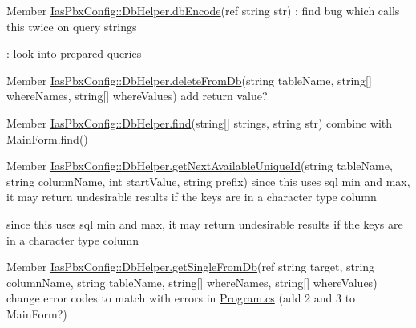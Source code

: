 \label{todo__todo000013}
\hypertarget{todo__todo000013}{}
 
\begin{DoxyDescription}
\item[Member \hyperlink{class_ias_pbx_config_1_1_db_helper_aad194ee869204b99082e7779888addd1}{IasPbxConfig::DbHelper.dbEncode}(ref string str) ]: find bug which calls this twice on query strings 

: look into prepared queries 
\end{DoxyDescription}

\label{todo__todo000021}
\hypertarget{todo__todo000021}{}
 
\begin{DoxyDescription}
\item[Member \hyperlink{class_ias_pbx_config_1_1_db_helper_a0b0e09192378e91c00084b10b52bff0a}{IasPbxConfig::DbHelper.deleteFromDb}(string tableName, string\mbox{[}\mbox{]} whereNames, string\mbox{[}\mbox{]} whereValues) ]add return value? 
\end{DoxyDescription}

\label{todo__todo000014}
\hypertarget{todo__todo000014}{}
 
\begin{DoxyDescription}
\item[Member \hyperlink{class_ias_pbx_config_1_1_db_helper_a92c16852946e46462fe8bb9923ce374c}{IasPbxConfig::DbHelper.find}(string\mbox{[}\mbox{]} strings, string str) ]combine with MainForm.find() 
\end{DoxyDescription}

\label{todo__todo000025}
\hypertarget{todo__todo000025}{}
 
\begin{DoxyDescription}
\item[Member \hyperlink{class_ias_pbx_config_1_1_db_helper_ae67ee3d912d67babce90e7ef22d1ef75}{IasPbxConfig::DbHelper.getNextAvailableUniqueId}(string tableName, string columnName, int startValue, string prefix) ]since this uses sql min and max, it may return undesirable results if the keys are in a character type column 

since this uses sql min and max, it may return undesirable results if the keys are in a character type column 
\end{DoxyDescription}

\label{todo__todo000019}
\hypertarget{todo__todo000019}{}
 
\begin{DoxyDescription}
\item[Member \hyperlink{class_ias_pbx_config_1_1_db_helper_afee22408d70a9c0f496b8f2957f19379}{IasPbxConfig::DbHelper.getSingleFromDb}(ref string target, string columnName, string tableName, string\mbox{[}\mbox{]} whereNames, string\mbox{[}\mbox{]} whereValues) ]change error codes to match with errors in \hyperlink{_program_8cs}{Program.cs} (add 2 and 3 to MainForm?) 
\end{DoxyDescription}


